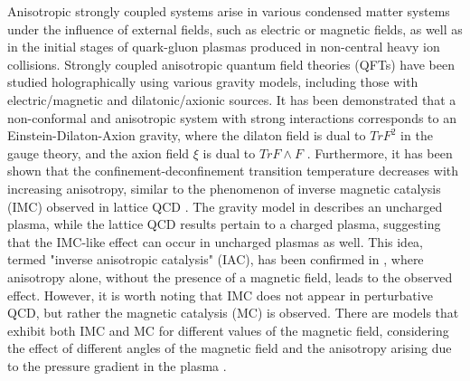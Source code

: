 \documentclass[]{article}
\begin{document}
Anisotropic strongly coupled systems arise in various condensed matter systems under the influence of external fields, such as electric or magnetic fields, as well as in the initial stages of quark-gluon plasmas produced in non-central heavy ion collisions. Strongly coupled anisotropic quantum field theories (QFTs) have been studied holographically using various gravity models, including those with electric/magnetic \cite{e1,e11,e12,e13,e14,e15,e16,e2} and dilatonic/axionic \cite{d1,d11,d12,d13,strong} sources. It has been demonstrated that a non-conformal and anisotropic system with strong interactions corresponds to an Einstein-Dilaton-Axion gravity, where the dilaton field is dual to $Tr F^2$ in the gauge theory, and the axion field $\xi$ is dual to $Tr F \wedge F$ \cite{strong}. Furthermore, it has been shown that the confinement-deconfinement transition temperature decreases with increasing anisotropy, similar to the phenomenon of inverse magnetic catalysis (IMC) observed in lattice QCD \cite{strong}. The gravity model in \cite{strong} describes an uncharged plasma, while the lattice QCD results pertain to a charged plasma, suggesting that the IMC-like effect can occur in uncharged plasmas as well. This idea, termed "inverse anisotropic catalysis" (IAC), has been confirmed in \cite{e2}, where anisotropy alone, without the presence of a magnetic field, leads to the observed effect. However, it is worth noting that IMC does not appear in perturbative QCD, but rather the magnetic catalysis (MC) is observed. There are models that exhibit both IMC and MC for different values of the magnetic field, considering the effect of different angles of the magnetic field and the anisotropy arising due to the pressure gradient in the plasma \cite{interply}.\\
\end{document}
